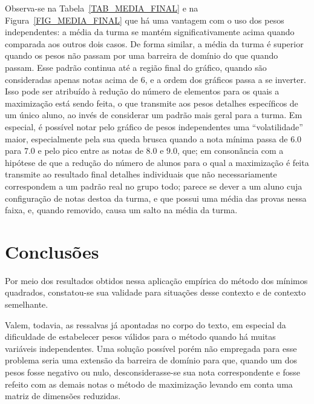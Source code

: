 \documentclass[11pt]{article}
\begin{document}
                Observa-se na
                Tabela~\ref{TAB_MEDIA_FINAL} e na
                Figura~\ref{FIG_MEDIA_FINAL} que há uma
                vantagem com o uso dos pesos independentes:
                a média da turma se mantém significativamente
                acima quando comparada aos outros dois casos.
                De forma similar, a média da turma é
                superior
                quando os pesos não passam por uma
                barreira de domínio do que quando passam.
                Esse padrão continua até a região final do
                gráfico, quando são consideradas apenas
                notas acima de $6$, e a ordem dos gráficos
                passa a se inverter. Isso pode ser atribuído
                à redução do número de elementos para os
                quais a maximização está sendo feita, o que
                transmite aos pesos detalhes específicos
                de um único aluno, ao invés de considerar
                um padrão mais geral para a turma.
                Em especial, é possível notar pelo gráfico
                de pesos independentes uma ``volatilidade''
                maior, especialmente pela sua queda brusca
                quando a nota mínima passa de $6.0$ para
                $7.0$ e pelo pico entre as notas de
                $8.0$ e $9.0$, que; em consonãncia com a
                hipótese de que a redução do número de
                alunos para o qual a maximização é feita
                transmite ao resultado final detalhes
                individuais que não necessariamente correspondem
                a um padrão real no grupo todo; parece se
                dever a um aluno cuja configuração de
                notas destoa da turma, e que possui uma
                média das provas nessa faixa, e, quando
                removido, causa um salto na média da turma.

        \section{Conclusões}
                Por meio dos resultados obtidos nessa
                aplicação empírica do método dos mínimos
                quadrados, constatou-se sua validade para
                situações desse contexto e de contexto
                semelhante.

                Valem, todavia, as ressalvas já apontadas no
                corpo do texto, em especial da dificuldade de
                estabelecer pesos válidos para o método quando
                há muitas variáveis independentes. Uma
                solução possível porém não empregada para esse
                problema seria uma extensão da barreira
                de domínio para que, quando um dos pesos
                fosse negativo ou nulo, desconsiderasse-se
                sua nota correspondente e fosse refeito com as
                demais notas o método de maximização levando
                em conta uma matriz de dimensões reduzidas.
\end{document}
